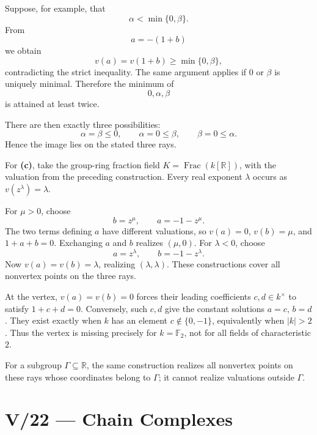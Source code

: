 \begin{solution}
Suppose, for example, that
\[
\alpha<\min\{0,\beta\}.
\]
From
\[
a=-(1+b)
\]
we obtain
\[
v(a)=v(1+b)\ge\min\{0,\beta\},
\]
contradicting the strict inequality. The same argument applies if \(0\) or
\(\beta\) is uniquely minimal. Therefore the minimum of
\[
0,\alpha,\beta
\]
is attained at least twice.

There are then exactly three possibilities:
\[
\alpha=\beta\le0,
\qquad
\alpha=0\le\beta,
\qquad
\beta=0\le\alpha.
\]
Hence the image lies on the stated three rays.

For \textbf{(c)}, take the group-ring fraction field
\(K=\operatorname{Frac}(k[\mathbb R])\), with the valuation from the
preceding construction. Every real exponent \(\lambda\) occurs as
\(v(z^\lambda)=\lambda\).

For \(\mu>0\), choose
\[
b=z^\mu,\qquad a=-1-z^\mu.
\]
The two terms defining \(a\) have different valuations, so
\(v(a)=0\), \(v(b)=\mu\), and \(1+a+b=0\). Exchanging \(a\) and
\(b\) realizes \((\mu,0)\). For \(\lambda<0\), choose
\[
a=z^\lambda,\qquad b=-1-z^\lambda.
\]
Now \(v(a)=v(b)=\lambda\), realizing \((\lambda,\lambda)\).
These constructions cover all nonvertex points on the three rays.

At the vertex, \(v(a)=v(b)=0\) forces their leading coefficients
\(c,d\in k^\times\) to satisfy \(1+c+d=0\). Conversely, such
\(c,d\) give the constant solutions \(a=c\), \(b=d\).
They exist exactly when \(k\) has an element
\(c\notin\{0,-1\}\), equivalently when \(|k|>2\).
Thus the vertex is missing precisely for \(k=\mathbb F_2\), not for
all fields of characteristic \(2\).

For a subgroup \(\Gamma\subseteq\mathbb R\), the same construction
realizes all nonvertex points on these rays whose coordinates belong
to \(\Gamma\); it cannot realize valuations outside \(\Gamma\).
\end{solution}



\section*{V/22 --- Chain Complexes}

